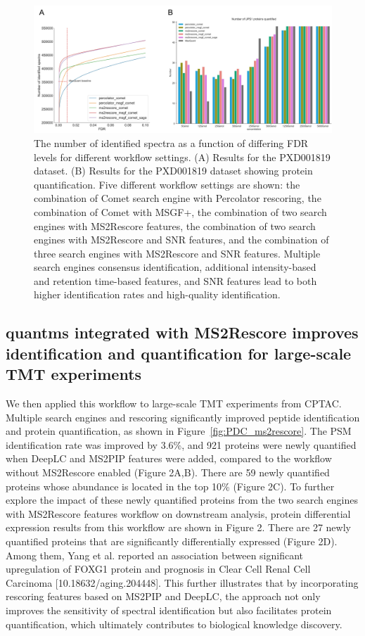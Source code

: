 \documentclass[12pt]{article}
\begin{document}
\begin{figure}[ht!]
	\centering
	\includegraphics[width=1\textwidth]{figures//PXD001819.jpg}
	\caption{The number of identified spectra as a function of differing FDR levels for different workflow settings. (A) Results for the PXD001819 dataset. (B) Results for the PXD001819 dataset showing protein quantification. Five different workflow settings are shown: the combination of Comet search engine with Percolator rescoring, the combination of Comet with MSGF+, the combination of two search engines with MS2Rescore features, the combination of two search engines with MS2Rescore and SNR features, and the combination of three search engines with MS2Rescore and SNR features. Multiple search engines consensus identification, additional intensity-based and retention time-based features, and SNR features lead to both higher identification rates and high-quality identification.}
	\label{fig:PXD001819_ms2rescore_pic}
\end{figure}

\subsection{quantms integrated with MS2Rescore improves identification and quantification for large-scale TMT experiments}
We then applied this workflow to large-scale TMT experiments from CPTAC. Multiple search engines and rescoring significantly improved peptide identification and protein quantification, as shown in Figure~\ref{fig:PDC_ms2rescore}. The PSM identification rate was improved by 3.6\%, and 921 proteins were newly quantified when DeepLC and MS2PIP features were added, compared to the workflow without MS2Rescore enabled (Figure 2A,B). There are 59 newly quantified proteins whose abundance is located in the top 10\% (Figure 2C). To further explore the impact of these newly quantified proteins from the two search engines with MS2Rescore features workflow on downstream analysis, protein differential expression results from this workflow are shown in Figure 2. There are 27 newly quantified proteins that are significantly differentially expressed (Figure 2D). Among them, Yang et al. reported an association between significant upregulation of FOXG1 protein and prognosis in Clear Cell Renal Cell Carcinoma [10.18632/aging.204448]. This further illustrates that by incorporating rescoring features based on MS2PIP and DeepLC, the approach not only improves the sensitivity of spectral identification but also facilitates protein quantification, which ultimately contributes to biological knowledge discovery.
\end{document}
